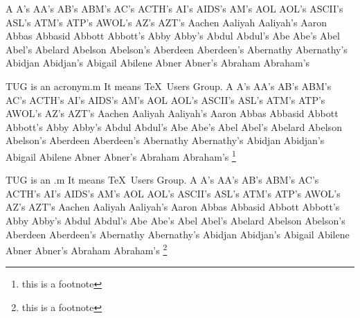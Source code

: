 \documentclass{article}
\begin{document}
A
A's
AA's
AB's
ABM's
AC's
ACTH's
AI's
AIDS's
AM's
AOL
AOL's
ASCII's
ASL's
ATM's
ATP's
AWOL's
AZ's
AZT's
Aachen
Aaliyah
Aaliyah's
Aaron
Abbas
Abbasid
Abbott
Abbott's
Abby
Abby's
Abdul
Abdul's
Abe
Abe's
Abel
Abel's
Abelard
Abelson
Abelson's
Aberdeen
Aberdeen's
Abernathy
Abernathy's
Abidjan
Abidjan's
Abigail
Abilene
Abner
Abner's
Abraham
Abraham's
\begin{minipage}{3cm}
TUG is an acronym.m It means \TeX\ Users Group.
A
A's
AA's
AB's
ABM's
AC's
ACTH's
AI's
AIDS's
AM's
AOL
AOL's
ASCII's
ASL's
ATM's
ATP's
AWOL's
AZ's
AZT's
Aachen
Aaliyah
Aaliyah's
Aaron
Abbas
Abbasid
Abbott
Abbott's
Abby
Abby's
Abdul
Abdul's
Abe
Abe's
Abel
Abel's
Abelard
Abelson
Abelson's
Aberdeen
Aberdeen's
Abernathy
Abernathy's
Abidjan
Abidjan's
Abigail
Abilene
Abner
Abner's
Abraham
Abraham's
\footnote{this is a footnote}
\end{minipage}
TUG is an .m It means \TeX\ Users Group.
A
A's
AA's
AB's
ABM's
AC's
ACTH's
AI's
AIDS's
AM's
AOL
AOL's
ASCII's
ASL's
ATM's
ATP's
AWOL's
AZ's
AZT's
Aachen
Aaliyah
Aaliyah's
Aaron
Abbas
Abbasid
Abbott
Abbott's
Abby
Abby's
Abdul
Abdul's
Abe
Abe's
Abel
Abel's
Abelard
Abelson
Abelson's
Aberdeen
Aberdeen's
Abernathy
Abernathy's
Abidjan
Abidjan's
Abigail
Abilene
Abner
Abner's
Abraham
Abraham's
\footnote{this is a footnote}
\end{document}
